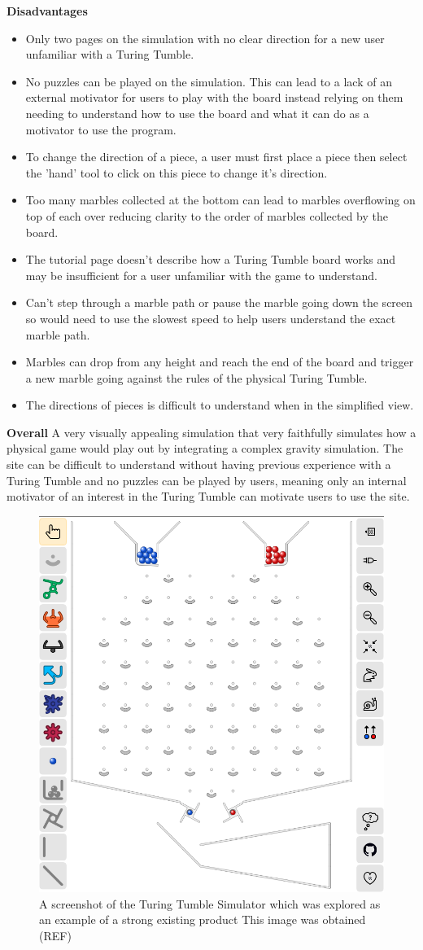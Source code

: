 \documentclass{l4proj}
\begin{document}
\textbf{Disadvantages}
\begin{itemize}
    \item Only two pages on the simulation with no clear direction for a new user unfamiliar with a Turing Tumble.
    \item No puzzles can be played on the simulation. This can lead to a lack of an external motivator for users to play with the board instead relying on them needing to understand how to use the board and what it can do as a motivator to use the program.
    \item To change the direction of a piece, a user must first place a piece then select the 'hand' tool to click on this piece to change it's direction. 
    \item Too many marbles collected at the bottom can lead to marbles overflowing on top of each over reducing clarity to the order of marbles collected by the board.
    \item The tutorial page doesn't describe how a Turing Tumble board works and may be insufficient for a user unfamiliar with the game to understand.
    \item Can't step through a marble path or pause the marble going down the screen so would need to use the slowest speed to help users understand the exact marble path.
    \item Marbles can drop from any height and reach the end of the board and trigger a new marble going against the rules of the physical Turing Tumble.
    \item The directions of pieces is difficult to understand when in the simplified view.
\end{itemize}

\textbf{Overall}
A very visually appealing simulation that very faithfully simulates how a physical game would play out by integrating a complex gravity simulation. The site can be difficult to understand without having previous experience with a Turing Tumble and no puzzles can be played by users, meaning only an internal motivator of an interest in the Turing Tumble can motivate users to use the site.

\begin{figure}
    \centering
    \includegraphics[width=0.5\linewidth]{images/gravitySim.png}
    \caption{A screenshot of the Turing Tumble Simulator which was explored as an example of a strong existing product This image was obtained (REF)}
    \label{fig:gravitySim}
\end{figure}
\end{document}
